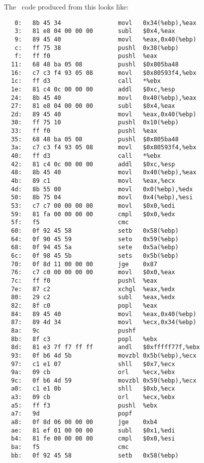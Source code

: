 
The \ia\ code produced from this looks like:

\begin{verbatim}
   0:	8b 45 34             	movl   0x34(%ebp),%eax
   3:	81 e8 04 00 00 00    	subl   $0x4,%eax
   9:	89 45 40             	movl   %eax,0x40(%ebp)
   c:	ff 75 38             	pushl  0x38(%ebp)
   f:	ff f0                	pushl  %eax
  11:	68 48 ba 05 08       	pushl  $0x805ba48
  16:	c7 c3 f4 93 05 08    	movl   $0x80593f4,%ebx
  1c:	ff d3                	call   *%ebx
  1e:	81 c4 0c 00 00 00    	addl   $0xc,%esp
  24:	8b 45 40             	movl   0x40(%ebp),%eax
  27:	81 e8 04 00 00 00    	subl   $0x4,%eax
  2d:	89 45 40             	movl   %eax,0x40(%ebp)
  30:	ff 75 10             	pushl  0x10(%ebp)
  33:	ff f0                	pushl  %eax
  35:	68 48 ba 05 08       	pushl  $0x805ba48
  3a:	c7 c3 f4 93 05 08    	movl   $0x80593f4,%ebx
  40:	ff d3                	call   *%ebx
  42:	81 c4 0c 00 00 00    	addl   $0xc,%esp
  48:	8b 45 40             	movl   0x40(%ebp),%eax
  4b:	89 c1                	movl   %eax,%ecx
  4d:	8b 55 00             	movl   0x0(%ebp),%edx
  50:	8b 75 04             	movl   0x4(%ebp),%esi
  53:	c7 c7 00 00 00 00    	movl   $0x0,%edi
  59:	81 fa 00 00 00 00    	cmpl   $0x0,%edx
  5f:	f5                   	cmc    
  60:	0f 92 45 58          	setb   0x58(%ebp)
  64:	0f 90 45 59          	seto   0x59(%ebp)
  68:	0f 94 45 5a          	sete   0x5a(%ebp)
  6c:	0f 98 45 5b          	sets   0x5b(%ebp)
  70:	0f 8d 11 00 00 00    	jge    0x87
  76:	c7 c0 00 00 00 00    	movl   $0x0,%eax
  7c:	ff f0                	pushl  %eax
  7e:	87 c2                	xchgl  %eax,%edx
  80:	29 c2                	subl   %eax,%edx
  82:	8f c0                	popl   %eax
  84:	89 45 40             	movl   %eax,0x40(%ebp)
  87:	89 4d 34             	movl   %ecx,0x34(%ebp)
  8a:	9c                   	pushf  
  8b:	8f c3                	popl   %ebx
  8d:	81 e3 7f f7 ff ff    	andl   $0xfffff77f,%ebx
  93:	0f b6 4d 5b          	movzbl 0x5b(%ebp),%ecx
  97:	c1 e1 07             	shll   $0x7,%ecx
  9a:	09 cb                	orl    %ecx,%ebx
  9c:	0f b6 4d 59          	movzbl 0x59(%ebp),%ecx
  a0:	c1 e1 0b             	shll   $0xb,%ecx
  a3:	09 cb                	orl    %ecx,%ebx
  a5:	ff f3                	pushl  %ebx
  a7:	9d                   	popf   
  a8:	0f 8d 06 00 00 00    	jge    0xb4
  ae:	81 ef 01 00 00 00    	subl   $0x1,%edi
  b4:	81 fe 00 00 00 00    	cmpl   $0x0,%esi
  ba:	f5                   	cmc    
  bb:	0f 92 45 58          	setb   0x58(%ebp)

\end{verbatim}
